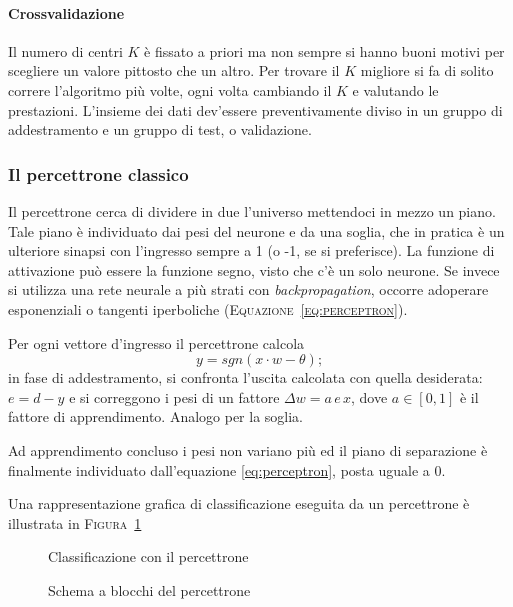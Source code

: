 \paragraph{Crossvalidazione}
Il numero di centri $K$ \`e fissato a priori
ma non sempre si hanno buoni motivi per scegliere un valore pittosto che un altro.
Per trovare il $K$ migliore si fa di solito correre l'algoritmo pi\`u volte,
ogni volta cambiando il $K$ e valutando le prestazioni.
L'insieme dei dati dev'essere preventivamente diviso
in un gruppo di addestramento e un gruppo di test, o validazione.



\subsubsection{Il percettrone classico}
Il percettrone cerca di dividere in due l'universo
mettendoci in mezzo un piano.
Tale piano \`e individuato dai pesi del neurone
e da una soglia, che in pratica \`e un ulteriore sinapsi
con l'ingresso sempre a 1 (o -1, se si preferisce).
La funzione di attivazione può essere la funzione segno, visto che c'è un solo neurone. Se invece si utilizza una rete neurale a più strati con \textit{backpropagation}, occorre adoperare esponenziali o tangenti iperboliche
(\textsc{Equazione~\ref{eq:perceptron}}).

Per ogni vettore d'ingresso
il percettrone calcola 
\begin{equation}
	y = sgn \left(x \cdot w - \theta \right);
	\label{eq:perceptron}
\end{equation}
in fase di addestramento, si confronta l'uscita calcolata
con quella desiderata: $e=d-y$
e si correggono i pesi di un fattore $\Delta w = a\,e\,x$,
dove $a \in [0, 1]$ \`e il fattore di apprendimento.
Analogo per la soglia.

Ad apprendimento concluso i pesi non variano pi\`u
ed il piano di separazione \`e finalmente individuato
dall'equazione \ref{eq:perceptron}, posta uguale a 0.

Una rappresentazione grafica di classificazione eseguita da un percettrone è illustrata in \textsc{Figura~\ref{fig:clus_perc}}

\begin{figure}
\centering

\caption{Classificazione con il percettrone}
\label{fig:clus_perc}
\end{figure}

\begin{figure}
\centering
 
 \caption{Schema a blocchi del percettrone}
 \label{fig:perceprton}
\end{figure}


